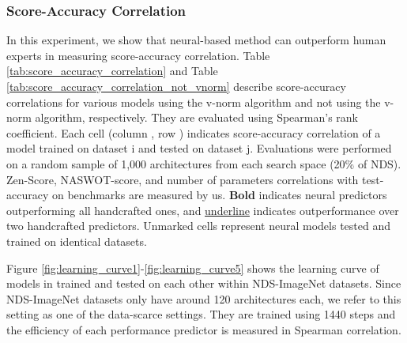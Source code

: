 \documentclass[lettersize,journal]{IEEEtran}
\begin{document}
        \subsubsection{Score-Accuracy Correlation}
            In this experiment, we show that neural-based method can outperform human experts in measuring score-accuracy correlation. Table \ref{tab:score_accuracy_correlation} and Table \ref{tab:score_accuracy_correlation_not_vnorm} describe score-accuracy correlations for various models using the v-norm algorithm and not using the v-norm algorithm, respectively. They are evaluated using Spearman's rank coefficient. Each cell (column , row ) indicates score-accuracy correlation of a model trained on dataset i and tested on dataset j. Evaluations were performed on a random sample of 1,000 architectures from each search space (20\% of NDS). Zen-Score, NASWOT-score, and number of parameters correlations with test-accuracy on benchmarks are measured by us. \textbf{Bold} indicates neural predictors outperforming all handcrafted ones, and \underline{underline} indicates outperformance over two handcrafted predictors. Unmarked cells represent neural models tested and trained on identical datasets.

            Figure \ref{fig:learning_curve1}-\ref{fig:learning_curve5} shows the learning curve of models in trained and tested on each other within NDS-ImageNet datasets. Since NDS-ImageNet datasets only have around 120 architectures each, we refer to this setting as one of the data-scarce settings. They are trained using 1440 steps and the efficiency of each performance predictor is measured in Spearman correlation.
\end{document}
